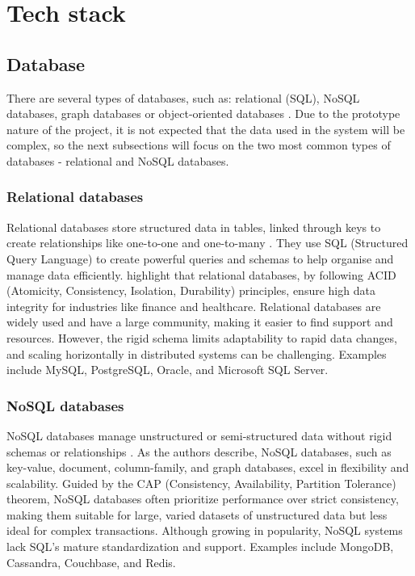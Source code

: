 \section{Tech stack}

\subsection{Database}

There are several types of databases, such as: relational (SQL), NoSQL databases, graph databases or object-oriented databases \parencite{databases2}. Due to the prototype nature of the project, it is not expected that the data used in the system will be complex, so the next subsections will focus on the two most common types of databases - relational and NoSQL databases.

\subsubsection{Relational databases}

Relational databases store structured data in tables, linked through keys to create relationships like one-to-one and one-to-many \parencite{databases}. They use SQL (Structured Query Language) to create powerful queries and schemas to help organise and manage data efficiently. \textcite{databases} highlight that relational databases, by following ACID (Atomicity, Consistency, Isolation, Durability) principles, ensure high data integrity for industries like finance and healthcare. Relational databases are widely used and have a large community, making it easier to find support and resources. However, the rigid schema limits adaptability to rapid data changes, and scaling horizontally in distributed systems can be challenging. Examples include MySQL, PostgreSQL, Oracle, and Microsoft SQL Server.

\subsubsection{NoSQL databases}

NoSQL databases manage unstructured or semi-structured data without rigid schemas or relationships \parencite{databases}. As the authors describe, NoSQL databases, such as key-value, document, column-family, and graph databases, excel in flexibility and scalability. Guided by the CAP (Consistency, Availability, Partition Tolerance) theorem, NoSQL databases often prioritize performance over strict consistency, making them suitable for large, varied datasets of unstructured data but less ideal for complex transactions. Although growing in popularity, NoSQL systems lack SQL’s mature standardization and support. Examples include MongoDB, Cassandra, Couchbase, and Redis.

